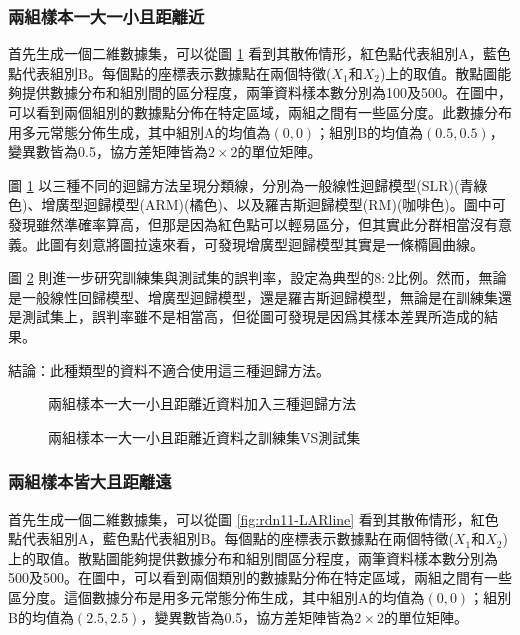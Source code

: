 \subsubsection{兩組樣本一大一小且距離近}

首先生成一個二維數據集，可以從圖 \ref{fig:rdn10-LARline} 看到其散佈情形，紅色點代表組別A，藍色點代表組別B。每個點的座標表示數據點在兩個特徵($X_1$和$X_2$)上的取值。散點圖能夠提供數據分布和組別間的區分程度，兩筆資料樣本數分別為100及500。在圖中，可以看到兩個組別的數據點分佈在特定區域，兩組之間有一些區分度。此數據分布用多元常態分佈生成，其中組別A的均值為$(0, 0)$；組別B的均值為$(0.5, 0.5)$，變異數皆為0.5，協方差矩陣皆為$2 \times 2$的單位矩陣。

圖 \ref{fig:rdn10-LARline} 以三種不同的迴歸方法呈現分類線，分別為一般線性迴歸模型(SLR)(青綠色)、增廣型迴歸模型(ARM)(橘色)、以及羅吉斯迴歸模型(RM)(咖啡色)。圖中可發現雖然準確率算高，但那是因為紅色點可以輕易區分，但其實此分群相當沒有意義。此圖有刻意將圖拉遠來看，可發現增廣型迴歸模型其實是一條橢圓曲線。

圖 \ref{fig:rdn10-LARline2} 則進一步研究訓練集與測試集的誤判率，設定為典型的$8:2$比例。然而，無論是一般線性回歸模型、增廣型迴歸模型，還是羅吉斯迴歸模型，無論是在訓練集還是測試集上，誤判率雖不是相當高，但從圖可發現是因爲其樣本差異所造成的結果。

結論：此種類型的資料不適合使用這三種迴歸方法。
\begin{figure}[h]
    \caption{兩組樣本一大一小且距離近資料加入三種迴歸方法}
    \label{fig:rdn10-LARline}
\end{figure}
\begin{figure}[h]
    \caption{兩組樣本一大一小且距離近資料之訓練集VS測試集}
    \label{fig:rdn10-LARline2}
\end{figure}

\subsubsection{兩組樣本皆大且距離遠}

首先生成一個二維數據集，可以從圖 \ref{fig:rdn11-LARline} 看到其散佈情形，紅色點代表組別A，藍色點代表組別B。每個點的座標表示數據點在兩個特徵($X_1$和$X_2$)上的取值。散點圖能夠提供數據分布和組別間區分程度，兩筆資料樣本數分別為500及500。在圖中，可以看到兩個類別的數據點分佈在特定區域，兩組之間有一些區分度。這個數據分布是用多元常態分佈生成，其中組別A的均值為$(0, 0)$；組別B的均值為$(2.5, 2.5)$，變異數皆為0.5，協方差矩陣皆為$2 \times 2$的單位矩陣。

